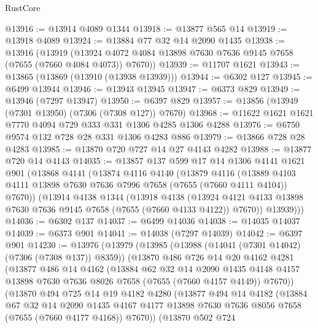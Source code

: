 \begin{lexlean}{RustCore}
\begin{coremodule}
@13916 := @13914 @4089 @1344
@13918 := @13877 @565 @14
@13919 := @13918 @4089
@13924 := @13884 @77 @32 @14 @2090 @1435
@13938 := @13916
    (@13919 (@13924 @4072 @4084 @13898 @7630 @7636 @9145 @7658 (@7655 (@7660 @4084 @4073)) @7670))
@13939 := @11707 @1621
@13943 := @13865 (@13869 (@13910 (@13938 @13939)))
@13944 := @6302 @127
@13945 := @6499 @13944
@13946 := @13943 @13945
@13947 := @6373 @829
@13949 := @13946 (@7297 @13947)
@13950 := @6397 @829
@13957 := @13856 (@13949 (@7301 @13950) (@7306 (@7308 @127)) @7670)
@13968 := @11622 @1621 @1621 @7770 @4094 @729 @333 @331 @1306 @4285 @1306 @4288
@13976 := @6750 @9574 @132 @728 @28 @331 @1306 @4283 @886
@13979 := @13866 @728 @28 @4283
@13985 := @13870 @720 @727 @14 @27 @4143 @4282
@13988 := @13877 @720 @14 @4143
@14035 := @13857
    @137
    @599
    @17
    @14
    @1306
    @4141
    @1621
    @901
    (@13868
      @4141
      (@13874
        @4116
        @4140
        (@13879
          @4116
          (@13889 @4103 @4111 @13898 @7630 @7636 @7996 @7658 (@7655 (@7660 @4111 @4104)) @7670))
        (@13914
          @4138
          @1344
          (@13918
            @4138
            (@13924 @4121 @4133 @13898 @7630 @7636 @9145 @7658 (@7655 (@7660 @4133 @4122)) @7670))
          @13939)))
@14036 := @6302 @137
@14037 := @6499 @14036
@14038 := @14035 @14037
@14039 := @6373 @901
@14041 := @14038 (@7297 @14039)
@14042 := @6397 @901
@14230 := @13976
    (@13979
      (@13985
        (@13988 (@14041 (@7301 @14042) (@7306 (@7308 @137)) @8359))
        (@13870
          @486
          @726
          @14
          @20
          @4162
          @4281
          (@13877
            @486
            @14
            @4162
            (@13884
              @62
              @32
              @14
              @2090
              @1435
              @4148
              @4157
              @13898
              @7630
              @7636
              @8026
              @7658
              (@7655 (@7660 @4157 @4149))
              @7670))
          (@13870
            @494
            @725
            @14
            @19
            @4182
            @4280
            (@13877
              @494
              @14
              @4182
              (@13884
                @67
                @32
                @14
                @2090
                @1435
                @4167
                @4177
                @13898
                @7630
                @7636
                @8056
                @7658
                (@7655 (@7660 @4177 @4168))
                @7670))
            (@13870
              @502
              @724

\end{coremodule}
\end{lexlean}

